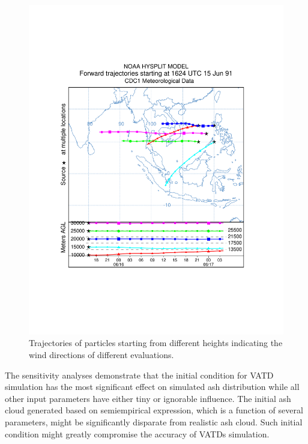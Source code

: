 \documentclass[draft,linenumbers]{agujournal2019}
\begin{document}
\begin{figure}[!htb]
    \centering
    \begin{minipage}{.75 \textwidth}
        \centering
        \includegraphics[width=0.99 \textwidth]{Figures/trajplot_test3_10_30K_ok}
    \end{minipage}%
    \caption{Trajectories of particles starting from different heights indicating the wind directions of different evaluations.}
    \label{fig:hysplit-1624-utc}
\end{figure}

The sensitivity analyses demonstrate that the initial condition for VATD simulation has the most significant effect on simulated ash distribution while all other input parameters have either tiny or ignorable influence. The initial ash cloud generated based on semiempirical expression, which is a function of several parameters, might be significantly disparate from realistic ash cloud. Such initial condition might greatly compromise the accuracy of VATDs simulation.
\end{document}
